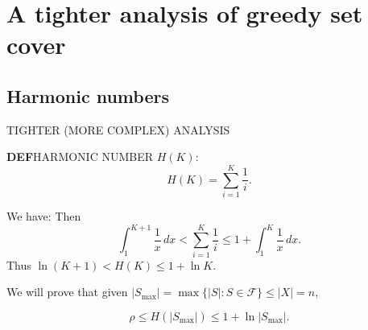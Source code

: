 \section{A tighter analysis of greedy set cover}
\subsection{Harmonic numbers}
TIGHTER (MORE COMPLEX) ANALYSIS
\begin{notesdefinition}
\textbf{DEF}\quad HARMONIC NUMBER $H(K)$:
\[H(K)=\sum_{i=1}^K\frac1i.\]
\end{notesdefinition}
We have:
Then
\[\int_1^{K+1}\frac1x\,dx<\sum_{i=1}^K\frac1i
\leq1+\int_1^K\frac1x\,dx.\]
Thus $\ln(K+1)<H(K)\leq1+\ln K$.

We will prove that given $|S_{\max}|=\max\{|S|:S\in\mathcal F\}\leq|X|=n$,
\begin{notesresult}
\[\rho\leq H(|S_{\max}|)\leq1+\ln|S_{\max}|.\]
\end{notesresult}
